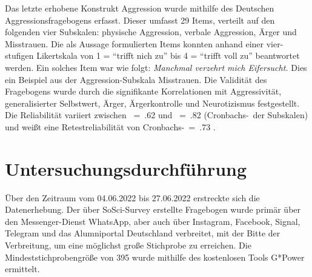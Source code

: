 Das letzte erhobene Konstrukt Aggression wurde mithilfe des Deutschen Aggressionsfragebogens erfasst. Dieser umfasst 29 Items, verteilt auf den folgenden vier Subskalen: physische Aggression, verbale Aggression, Ärger und Misstrauen. Die als Aussage formulierten Items konnten anhand einer vier-stufigen Likertskala von 1 = \enquote{trifft nich zu} bis 4 = \enquote{trifft voll zu} beantwortet werden. Ein solches Item war wie folgt: \textit{Manchmal verzehrt mich Eifersucht.} Dies ein Beispiel aus der Aggression-Subskala Misstrauen. Die Validität des Fragebogens wurde durch die signifikante Korrelationen mit Aggressivität, generalisierter Selbstwert, Ärger, Ärgerkontrolle und Neurotizismus festgestellt. Die Reliabilität variiert zwischen \textalpha~=~.62 und \textalpha~=~.82 (Cronbachs-\textalpha~der Subskalen) und weißt eine Retestreliabilität von Cronbachs-\textalpha~=~.73 \parencite{Aggressionsfragebogen}.



\section{Untersuchungsdurchführung}   \label{sec_3.4}
Über den Zeitraum vom 04.06.2022 bis 27.06.2022 erstreckte sich die Datenerhebung. Der über SoSci-Survey\textsuperscript{\textregistered} erstellte Fragebogen wurde primär über den Messenger-Dienst WhatsApp\textsuperscript{\textregistered}, aber auch über Instagram\textsuperscript{\textregistered}, Facebook\textsuperscript{\textregistered}, Signal\textsuperscript{\textregistered}, Telegram\textsuperscript{\textregistered} und das Alumniportal Deutschland\textsuperscript{\textregistered} verbreitet, mit der Bitte der Verbreitung, um eine möglichst große Stichprobe zu erreichen. Die Mindeststichprobengröße von 395 wurde mithilfe des kostenlosen Tools G*Power\textsuperscript{\textregistered} ermittelt. %


